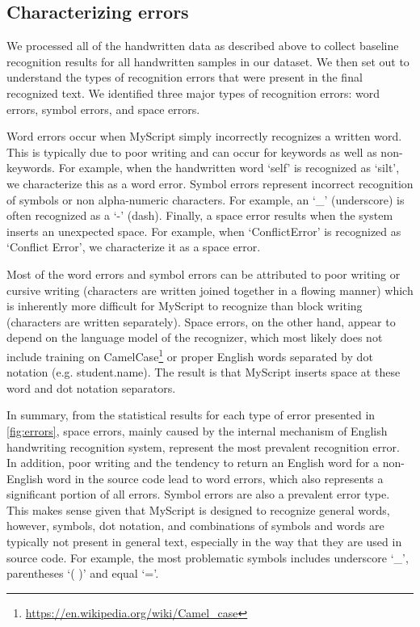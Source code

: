 \documentclass{vgtc}                          %
\begin{document}
\subsection{Characterizing errors}
\label{sec:characterizing}
We processed all of the handwritten data as described above to collect baseline recognition results for all handwritten samples in our dataset.  We then set out to understand the types of recognition errors that were present in the final recognized text. We identified three major types of recognition errors: word errors, symbol errors, and space errors. 

Word errors occur when MyScript simply incorrectly recognizes a written word. This is typically due to poor writing and can occur for keywords as well as non-keywords.
For example, when the handwritten word `self' is recognized as `silt', we characterize this as a word error. 
Symbol errors represent incorrect recognition of symbols or non alpha-numeric characters.
For example, an `\_' (underscore) is often recognized as a `-' (dash). 
Finally, a space error results when the system inserts an unexpected space.
For example, when `ConflictError' is recognized as `Conflict Error', we characterize it as a space error. 

Most of the word errors and symbol errors can be attributed to poor writing or cursive writing (characters are written joined together in a flowing manner) which is inherently more difficult for MyScript to recognize than block writing (characters are written separately). Space errors, on the other hand, appear to depend on the language model of the recognizer, which most likely does not include training on CamelCase\footnote{\url{https://en.wikipedia.org/wiki/Camel\_case}} or proper English words separated by dot notation (e.g. student.name).  The result is that MyScript inserts space at these word and dot notation separators.

In summary, from the statistical results for each type of error presented in \autoref{fig:errors}, space errors, mainly caused by the internal mechanism of English handwriting recognition system, represent the most prevalent recognition error. In addition, poor writing and the tendency to return an English word for a non-English word in the source code lead to word errors, which also represents a significant portion of all errors. Symbol errors are also a prevalent error type. This makes sense given that MyScript is designed to recognize general words, however, symbols, dot notation, and combinations of symbols and words are typically not present in general text, especially in the way that they are used in source code. For example, the most problematic symbols includes underscore `\_', parentheses `( )' and equal `='.
\end{document}
